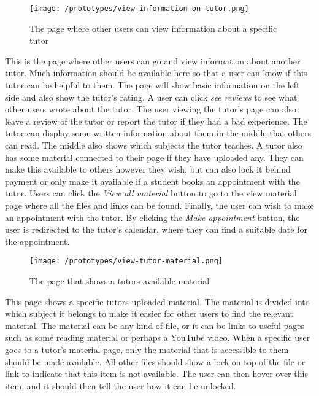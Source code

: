  \begin{figure}[H]
    \texttt{[image: /prototypes/view-information-on-tutor.png]}
     \caption{The page where other users can view information about a specific tutor}
     \label{fig:view-information-on-tutor}
 \end{figure}
This is the page where other users can go and view information about another tutor. 
Much information should be available here so that a user can know if this tutor can be helpful to them.
The page will show basic information on the left side and also show the tutor's rating. 
A user can click \textit{see reviews} to see what other users wrote about the tutor. 
The user viewing the tutor's page can also leave a review of the tutor or report the tutor if they had a bad experience. 
The tutor can display some written information about them in the middle that others can read. 
The middle also shows which subjects the tutor teaches. 
A tutor also has some material connected to their page if they have uploaded any. 
They can make this available to others however they wish, but can also lock it behind payment or only make it available if a student books an appointment with the tutor.
Users can click the \textit{View all material} button to go to the view material page where all the files and links can be found. 
Finally, the user can wish to make an appointment with the tutor. 
By clicking the \textit{Make appointment} button, the user is redirected to the tutor's calendar, where they can find a suitable date for the appointment. 


 \begin{figure}[H]
    \texttt{[image: /prototypes/view-tutor-material.png]}
     \caption{The page that shows a tutors available material}
     \label{fig:view-tutor-material}
 \end{figure}
This page shows a specific tutors uploaded material. 
The material is divided into which subject it belongs to make it easier for other users to find the relevant material. 
The material can be any kind of file, or it can be links to useful pages such as some reading material or perhaps a YouTube video. 
When a specific user goes to a tutor's material page, only the material that is accessible to them should be made available. 
All other files should show a lock on top of the file or link to indicate that this item is not available. 
The user can then hover over this item, and it should then tell the user how it can be unlocked. 
